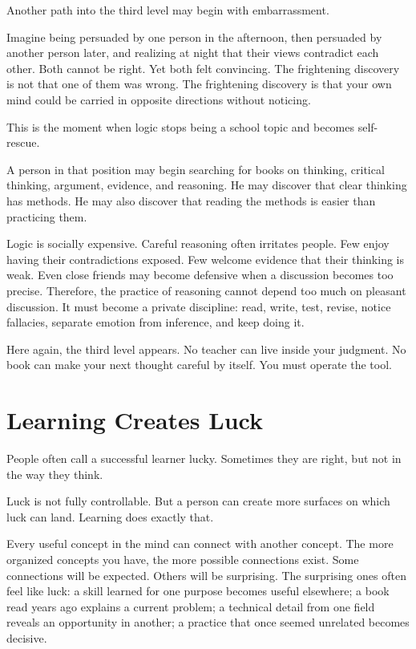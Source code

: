 Another path into the third level may begin with embarrassment.

Imagine being persuaded by one person in the afternoon, then persuaded by another person later, and realizing at night that their views contradict each other. Both cannot be right. Yet both felt convincing. The frightening discovery is not that one of them was wrong. The frightening discovery is that your own mind could be carried in opposite directions without noticing.

This is the moment when logic stops being a school topic and becomes self-rescue.

A person in that position may begin searching for books on thinking, critical thinking, argument, evidence, and reasoning. He may discover that clear thinking has methods. He may also discover that reading the methods is easier than practicing them.

Logic is socially expensive. Careful reasoning often irritates people. Few enjoy having their contradictions exposed. Few welcome evidence that their thinking is weak. Even close friends may become defensive when a discussion becomes too precise. Therefore, the practice of reasoning cannot depend too much on pleasant discussion. It must become a private discipline: read, write, test, revise, notice fallacies, separate emotion from inference, and keep doing it.

Here again, the third level appears. No teacher can live inside your judgment. No book can make your next thought careful by itself. You must operate the tool.

\section*{Learning Creates Luck}

People often call a successful learner lucky. Sometimes they are right, but not in the way they think.

Luck is not fully controllable. But a person can create more surfaces on which luck can land. Learning does exactly that.

Every useful concept in the mind can connect with another concept. The more organized concepts you have, the more possible connections exist. Some connections will be expected. Others will be surprising. The surprising ones often feel like luck: a skill learned for one purpose becomes useful elsewhere; a book read years ago explains a current problem; a technical detail from one field reveals an opportunity in another; a practice that once seemed unrelated becomes decisive.

